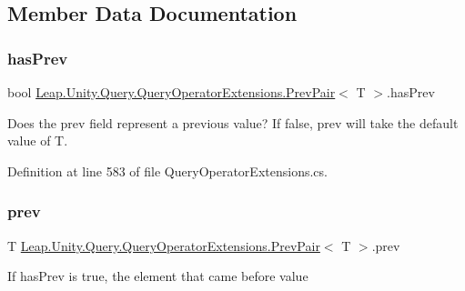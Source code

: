 \subsection{Member Data Documentation}
\mbox{\label{struct_leap_1_1_unity_1_1_query_1_1_query_operator_extensions_1_1_prev_pair_abfcf170a9dc5649fe180b5e13255e0f6}} 
\subsubsection{\texorpdfstring{hasPrev}{hasPrev}}
{\footnotesize\ttfamily bool \mbox{\hyperlink{struct_leap_1_1_unity_1_1_query_1_1_query_operator_extensions_1_1_prev_pair}{Leap.\+Unity.\+Query.\+Query\+Operator\+Extensions.\+Prev\+Pair}}$<$ T $>$.has\+Prev}



Does the prev field represent a previous value? If false, prev will take the default value of T. 



Definition at line 583 of file Query\+Operator\+Extensions.\+cs.

\mbox{\label{struct_leap_1_1_unity_1_1_query_1_1_query_operator_extensions_1_1_prev_pair_a6a09fdadcd8ead3c8050efe331b2117f}} 
\subsubsection{\texorpdfstring{prev}{prev}}
{\footnotesize\ttfamily T \mbox{\hyperlink{struct_leap_1_1_unity_1_1_query_1_1_query_operator_extensions_1_1_prev_pair}{Leap.\+Unity.\+Query.\+Query\+Operator\+Extensions.\+Prev\+Pair}}$<$ T $>$.prev}



If has\+Prev is true, the element that came before value 



